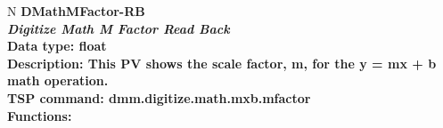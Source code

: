 \documentclass[openany]{article}
\begin{document}
		\begin{tabular}{N}
			\hline
			\bfseries DMathMFactor-RB\label{pv:dmathmfactor-rb} \\ \hline
			\emph{Digitize Math M Factor Read Back} \\
			Data type: float \\
			Description: This PV shows the scale factor, m, for the y = mx + b math operation. \\
			TSP command: dmm.digitize.math.mxb.mfactor \\
			Functions: \\
			\arrayrulecolor{\FuncTableBorderColor}

		\end{tabular}
\end{document}
